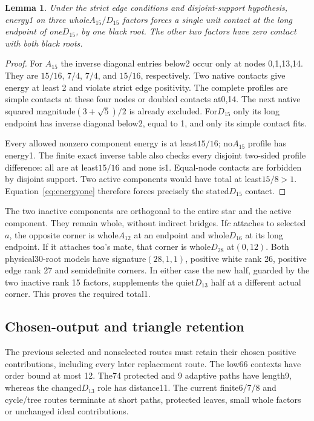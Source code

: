 \documentclass[11pt]{article}
\newtheorem{lemma}[theorem]{Lemma}
\theoremstyle{remark}\newtheorem{remark}[theorem]{Remark}
\begin{document}
\begin{lemma}\label{lem:rank 15}
Under the strict edge conditions and disjoint-support hypothesis,
energy1 on three whole$A_{15}/D_{15}$ factors forces a single unit contact
at the long endpoint of one$D_{15}$, by one black root. The other two
factors have zero contact with both black roots.
\end{lemma}
\begin{proof}
For $A_{15}$ the inverse diagonal entries below2 occur only at nodes
0,1,13,14. They are $15/16$, $7/4$, $7/4$, and $15/16$, respectively.
Two native contacts give energy
at least 2 and violate strict edge positivity. The complete profiles are
simple contacts at these four nodes or doubled contacts at0,14. The next
native squared magnitude$(3+\sqrt5)/2$ is already excluded.
For$D_{15}$ only its long endpoint has inverse diagonal below2, equal
to 1, and only its simple contact fits.

Every allowed nonzero component energy is at least$15/16$; no$A_{15}$
profile has energy1. The finite exact inverse table also checks every
disjoint two-sided profile difference: all are at least$15/16$ and none
is1. Equal-node contacts are forbidden by disjoint support. Two active
components would have total at least$15/8>1$. Equation~\eqref{eq:energyone}
therefore forces precisely the stated$D_{15}$ contact.
\end{proof}

The two inactive components are orthogonal to the entire star and the
active component. They remain whole, without indirect bridges. If$c$
attaches to selected$a$, the opposite corner is whole$A_{12}$ at an
endpoint and whole$D_{16}$ at its long endpoint. If it attaches to$a$'s
mate, that corner is whole$D_{28}$ at$(0,12)$. Both physical30-root
models have signature$(28,1,1)$, positive white rank 26, positive edge
rank 27 and semidefinite corners. In either case the new half, guarded by
the two inactive rank 15 factors, supplements the quiet$D_{13}$ half
at a different actual corner. This proves the required total1.

\subsection{Chosen-output and triangle retention}
The previous selected and nonselected routes must retain their chosen
positive contributions, including every later replacement route. The
low66 contexts have order bound at most 12. The74 protected and 9 adaptive
paths have length9, whereas the changed$D_{13}$ role has distance11.
The current finite6/7/8 and cycle/tree routes terminate at short paths,
protected leaves, small whole factors or unchanged ideal contributions.
\end{document}
